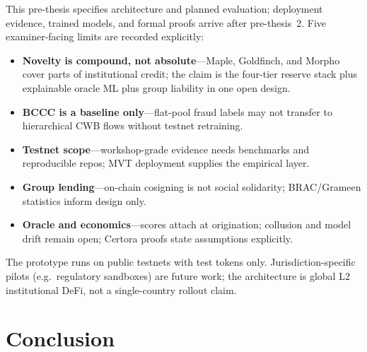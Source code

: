 \documentclass[12pt, a4paper]{report}
\begin{document}
This pre-thesis specifies architecture and planned evaluation; deployment evidence, trained models, and formal proofs arrive after pre-thesis~2. Five examiner-facing limits are recorded explicitly:

\begin{itemize}[noitemsep]
\item \textbf{Novelty is compound, not absolute}---Maple, Goldfinch, and Morpho cover parts of institutional credit; the claim is the four-tier reserve stack plus explainable oracle ML plus group liability in one open design.
\item \textbf{BCCC is a baseline only}---flat-pool fraud labels may not transfer to hierarchical CWB flows without testnet retraining.
\item \textbf{Testnet scope}---workshop-grade evidence needs benchmarks and reproducible repos; MVT deployment supplies the empirical layer.
\item \textbf{Group lending}---on-chain cosigning is not social solidarity; BRAC/Grameen statistics inform design only.
\item \textbf{Oracle and economics}---scores attach at origination; collusion and model drift remain open; Certora proofs state assumptions explicitly.
\end{itemize}

The prototype runs on public testnets with test tokens only. Jurisdiction-specific pilots (e.g.\ regulatory sandboxes) are future work; the architecture is global L2 institutional DeFi, not a single-country rollout claim.

\chapter{Conclusion}
\end{document}
